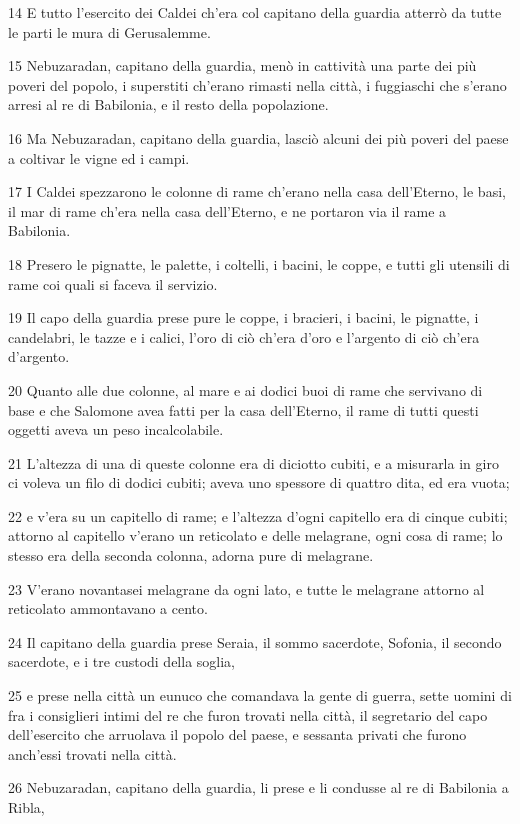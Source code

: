 \par 14 E tutto l'esercito dei Caldei ch'era col capitano della guardia atterrò da tutte le parti le mura di Gerusalemme.
\par 15 Nebuzaradan, capitano della guardia, menò in cattività una parte dei più poveri del popolo, i superstiti ch'erano rimasti nella città, i fuggiaschi che s'erano arresi al re di Babilonia, e il resto della popolazione.
\par 16 Ma Nebuzaradan, capitano della guardia, lasciò alcuni dei più poveri del paese a coltivar le vigne ed i campi.
\par 17 I Caldei spezzarono le colonne di rame ch'erano nella casa dell'Eterno, le basi, il mar di rame ch'era nella casa dell'Eterno, e ne portaron via il rame a Babilonia.
\par 18 Presero le pignatte, le palette, i coltelli, i bacini, le coppe, e tutti gli utensili di rame coi quali si faceva il servizio.
\par 19 Il capo della guardia prese pure le coppe, i bracieri, i bacini, le pignatte, i candelabri, le tazze e i calici, l'oro di ciò ch'era d'oro e l'argento di ciò ch'era d'argento.
\par 20 Quanto alle due colonne, al mare e ai dodici buoi di rame che servivano di base e che Salomone avea fatti per la casa dell'Eterno, il rame di tutti questi oggetti aveva un peso incalcolabile.
\par 21 L'altezza di una di queste colonne era di diciotto cubiti, e a misurarla in giro ci voleva un filo di dodici cubiti; aveva uno spessore di quattro dita, ed era vuota;
\par 22 e v'era su un capitello di rame; e l'altezza d'ogni capitello era di cinque cubiti; attorno al capitello v'erano un reticolato e delle melagrane, ogni cosa di rame; lo stesso era della seconda colonna, adorna pure di melagrane.
\par 23 V'erano novantasei melagrane da ogni lato, e tutte le melagrane attorno al reticolato ammontavano a cento.
\par 24 Il capitano della guardia prese Seraia, il sommo sacerdote, Sofonia, il secondo sacerdote, e i tre custodi della soglia,
\par 25 e prese nella città un eunuco che comandava la gente di guerra, sette uomini di fra i consiglieri intimi del re che furon trovati nella città, il segretario del capo dell'esercito che arruolava il popolo del paese, e sessanta privati che furono anch'essi trovati nella città.
\par 26 Nebuzaradan, capitano della guardia, li prese e li condusse al re di Babilonia a Ribla,
